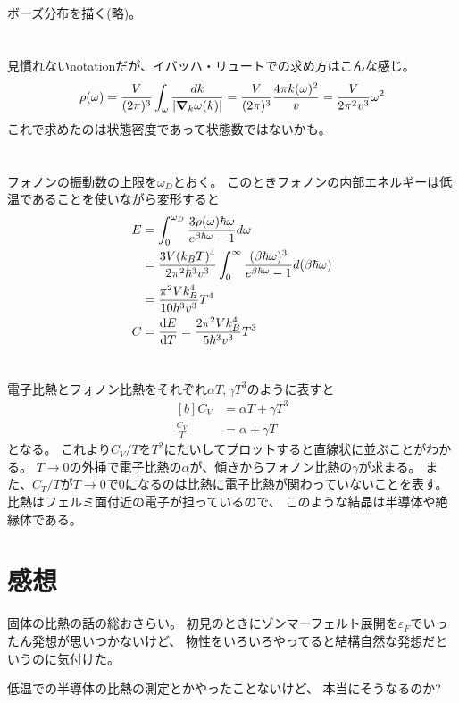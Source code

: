 \documentclass[../ap_2010.tex]{subfiles}
\begin{document}
\section{}
ボーズ分布を描く(略)。

\section{}
見慣れないnotationだが、イバッハ・リュートでの求め方はこんな感じ。
\begin{equation}\begin{aligned}[b]
    \rho(\omega) = \frac{V}{(2\pi)^3}\int_\omega \frac{dk}{\abs{\grad_k \omega(k)}}
    = \frac{V}{(2\pi)^3}\frac{4\pi k(\omega)^2}{v} = \frac{V}{2\pi^2 v^3}\omega^2
\end{aligned}\end{equation}
これで求めたのは状態密度であって状態数ではないかも。
\section{}
フォノンの振動数の上限を\(\omega_D\)とおく。
このときフォノンの内部エネルギーは低温であることを使いながら変形すると
\begin{equation}\begin{aligned}[b]
    E &= \int_0^{\omega_D}\frac{3\rho(\omega)\hbar\omega}{e^{\beta\hbar\omega}-1}d\omega\\
    &= \frac{3V(k_BT)^4}{2\pi^2\hbar^3v^3}\int_{0}^{\infty}\frac{(\beta\hbar\omega)^3}{e^{\beta\hbar\omega}-1}d(\beta\hbar\omega)\\
    &= \frac{\pi^2Vk_B^4}{10\hbar^3v^3}T^4\\
    C &= \dv{E}{T}=\frac{2\pi^2Vk_B^4}{5\hbar^3v^3}T^3
\end{aligned}\end{equation}

\section{}
電子比熱とフォノン比熱をそれぞれ\(\alpha T,\gamma T^3\)のように表すと
\begin{equation}\begin{aligned}[b]
    C_V &= \alpha T+\gamma T^3\\
    \frac{C_V}{T} &= \alpha +\gamma T
\end{aligned}\end{equation}
となる。
これより\(C_V/T\)を\(T^2\)にたいしてプロットすると直線状に並ぶことがわかる。
\(T\to 0\)の外挿で電子比熱の\(\alpha\)が、傾きからフォノン比熱の\(\gamma\)が求まる。
また、\(C_T/T\)が\(T\to 0\)で\(0\)になるのは比熱に電子比熱が関わっていないことを表す。
比熱はフェルミ面付近の電子が担っているので、
このような結晶は半導体や絶縁体である。

\section*{感想}
固体の比熱の話の総おさらい。
初見のときにゾンマーフェルト展開を\(\varepsilon_F\)でいったん発想が思いつかないけど、
物性をいろいろやってると結構自然な発想だというのに気付けた。

低温での半導体の比熱の測定とかやったことないけど、
本当にそうなるのか?
\end{document}
